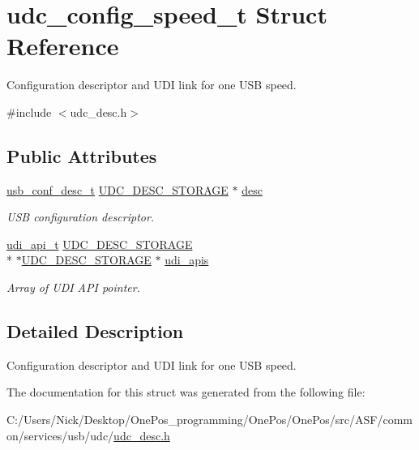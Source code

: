 \hypertarget{structudc__config__speed__t}{\section{udc\-\_\-config\-\_\-speed\-\_\-t Struct Reference}
\label{structudc__config__speed__t}
}


Configuration descriptor and U\-D\-I link for one U\-S\-B speed.  




{\ttfamily \#include $<$udc\-\_\-desc.\-h$>$}

\subsection*{Public Attributes}
\begin{DoxyCompactItemize}
\item 
\hypertarget{structudc__config__speed__t_a2b2dd8b8091a0c4e9b19989a1779c5af}{\hyperlink{structusb__conf__desc__t}{usb\-\_\-conf\-\_\-desc\-\_\-t} \hyperlink{group__udc__desc__group_gae086959cec07a2e71ab069e25a51764f}{U\-D\-C\-\_\-\-D\-E\-S\-C\-\_\-\-S\-T\-O\-R\-A\-G\-E} $\ast$ \hyperlink{structudc__config__speed__t_a2b2dd8b8091a0c4e9b19989a1779c5af}{desc}}\label{structudc__config__speed__t_a2b2dd8b8091a0c4e9b19989a1779c5af}

\begin{DoxyCompactList}\small\item\em U\-S\-B configuration descriptor. \end{DoxyCompactList}\item 
\hypertarget{structudc__config__speed__t_a2e343b988012ad9192a133d50eeab703}{\hyperlink{structudi__api__t}{udi\-\_\-api\-\_\-t} \hyperlink{group__udc__desc__group_gae086959cec07a2e71ab069e25a51764f}{U\-D\-C\-\_\-\-D\-E\-S\-C\-\_\-\-S\-T\-O\-R\-A\-G\-E} \\*
$\ast$\hyperlink{group__udc__desc__group_gae086959cec07a2e71ab069e25a51764f}{U\-D\-C\-\_\-\-D\-E\-S\-C\-\_\-\-S\-T\-O\-R\-A\-G\-E} $\ast$ \hyperlink{structudc__config__speed__t_a2e343b988012ad9192a133d50eeab703}{udi\-\_\-apis}}\label{structudc__config__speed__t_a2e343b988012ad9192a133d50eeab703}

\begin{DoxyCompactList}\small\item\em Array of U\-D\-I A\-P\-I pointer. \end{DoxyCompactList}\end{DoxyCompactItemize}


\subsection{Detailed Description}
Configuration descriptor and U\-D\-I link for one U\-S\-B speed. 

The documentation for this struct was generated from the following file\-:\begin{DoxyCompactItemize}
\item 
C\-:/\-Users/\-Nick/\-Desktop/\-One\-Pos\-\_\-programming/\-One\-Pos/\-One\-Pos/src/\-A\-S\-F/common/services/usb/udc/\hyperlink{udc__desc_8h}{udc\-\_\-desc.\-h}\end{DoxyCompactItemize}
